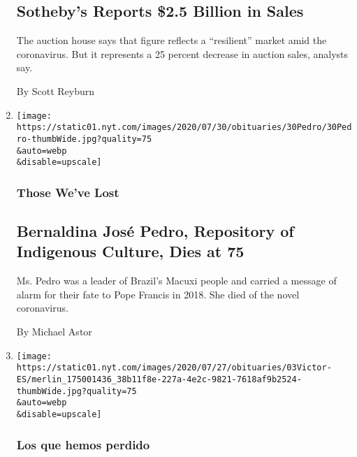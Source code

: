 \begin{enumerate}
{  \subsection{Sotheby's Reports \$2.5 Billion in
  Sales}\label{sothebys-reports-25-billion-in-sales}}

  The auction house says that figure reflects a ``resilient'' market
  amid the coronavirus. But it represents a 25 percent decrease in
  auction sales, analysts say.

  By Scott Reyburn
\item
  \href{/2020/08/03/obituaries/bernaldina-jose-pedro-dead-coronavirus.html}{}

  \texttt{[image: https://static01.nyt.com/images/2020/07/30/obituaries/30Pedro/30Pedro-thumbWide.jpg?quality=75\\\&auto=webp\\\&disable=upscale]}

  \hypertarget{those-weve-lost}{%
  \subsubsection{Those We've Lost}\label{those-weve-lost}}

  \hypertarget{bernaldina-josuxe9-pedro-repository-of-indigenous-culture-dies-at-75}{%
  \subsection{Bernaldina José Pedro, Repository of Indigenous Culture,
  Dies at
  75}\label{bernaldina-josuxe9-pedro-repository-of-indigenous-culture-dies-at-75}}

  Ms. Pedro was a leader of Brazil's Macuxi people and carried a message
  of alarm for their fate to Pope Francis in 2018. She died of the novel
  coronavirus.

  By Michael Astor
\item
  \href{/es/2020/08/03/espanol/cultura/victor-victor-murio-coronavirus.html}{}

  \texttt{[image: https://static01.nyt.com/images/2020/07/27/obituaries/03Victor-ES/merlin\_175001436\_38b11f8e-227a-4e2c-9821-7618af9b2524-thumbWide.jpg?quality=75\\\&auto=webp\\\&disable=upscale]}

  \hypertarget{los-que-hemos-perdido}{%
  \subsubsection{Los que hemos perdido}\label{los-que-hemos-perdido}}

  \hypertarget{vuxedctor-vuxedctor-conocido-por-el-uxe9xito-mesita-de-noche-muere-a-los-71-auxf1os}{%
}
\end{enumerate}
